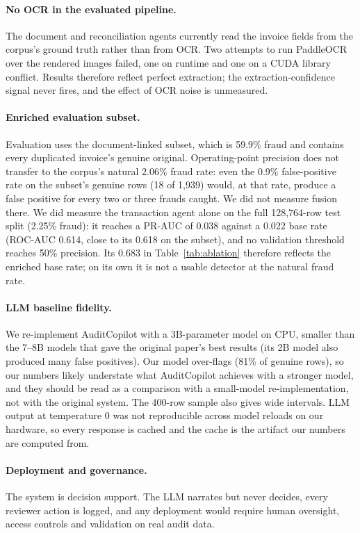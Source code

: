 \documentclass{article}
\begin{document}
\paragraph{No OCR in the evaluated pipeline.} The document and reconciliation agents currently read the invoice fields from the corpus's ground truth rather than from OCR. Two attempts to run PaddleOCR \citep{du2020ppocr} over the rendered images failed, one on runtime and one on a CUDA library conflict. Results therefore reflect perfect extraction; the extraction-confidence signal never fires, and the effect of OCR noise is unmeasured.

\paragraph{Enriched evaluation subset.} Evaluation uses the document-linked subset, which is 59.9\% fraud and contains every duplicated invoice's genuine original. Operating-point precision does not transfer to the corpus's natural 2.06\% fraud rate: even the 0.9\% false-positive rate on the subset's genuine rows (18 of 1,939) would, at that rate, produce a false positive for every two or three frauds caught. We did not measure fusion there. We did measure the transaction agent alone on the full 128,764-row test split (2.25\% fraud): it reaches a PR-AUC of 0.038 against a 0.022 base rate (ROC-AUC 0.614, close to its 0.618 on the subset), and no validation threshold reaches 50\% precision. Its 0.683 in Table~\ref{tab:ablation} therefore reflects the enriched base rate; on its own it is not a usable detector at the natural fraud rate.

\paragraph{LLM baseline fidelity.} We re-implement AuditCopilot with a 3B-parameter model on CPU, smaller than the 7--8B models that gave the original paper's best results (its 2B model also produced many false positives). Our model over-flags (81\% of genuine rows), so our numbers likely understate what AuditCopilot achieves with a stronger model, and they should be read as a comparison with a small-model re-implementation, not with the original system. The 400-row sample also gives wide intervals. LLM output at temperature 0 was not reproducible across model reloads on our hardware, so every response is cached and the cache is the artifact our numbers are computed from.

\paragraph{Deployment and governance.} The system is decision support. The LLM narrates but never decides, every reviewer action is logged, and any deployment would require human oversight, access controls and validation on real audit data.
\end{document}
